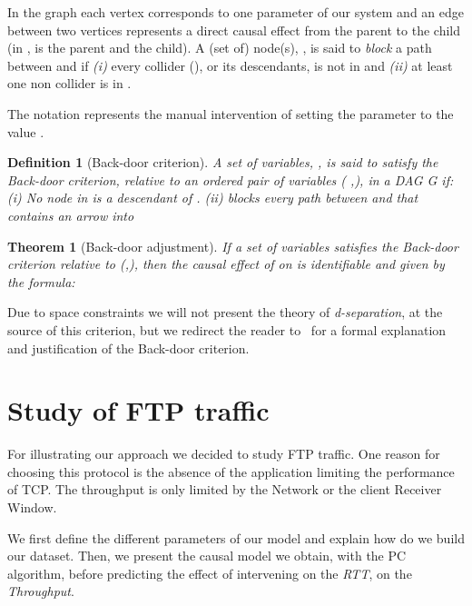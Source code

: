 \documentclass[]{algotel}
\newtheorem{mydef}{Definition}
\newtheorem{mytheor}{Theorem}
\begin{document}
In the graph each vertex corresponds to one parameter of our system and an edge between two vertices represents a direct causal effect from the parent to the child (in ,  is the parent and  the child). A (set of) node(s), , is said to \emph{block} a path between  and  if \textit{(i)} every collider (), or its descendants, is not in  and \textit{(ii)} at least one non collider is in .

The notation  represents the manual intervention of setting the parameter  to the value .

\begin{mydef}[Back-door criterion]
 A set of variables, , is said to satisfy the Back-door criterion, relative to an ordered
pair of variables ( ,), in a DAG G if: \textit{(i)} No node in  is a descendant of . \textit{(ii)}  blocks every path between  and  that contains an arrow into 
\end{mydef}

\begin{mytheor}[Back-door adjustment]
  If a set of variables  satisfies the Back-door criterion relative to (,), then the
  causal effect of  on  is identifiable and given by the formula:
  
\end{mytheor}

Due to space constraints we will not present the theory of \emph{d-separation}, at the source of this criterion, but we redirect the reader to~\cite{PearlJ2000} for a formal explanation and justification of the Back-door criterion.



\section{Study of FTP traffic}
\label{sec:ftpstudy}
For illustrating our approach we decided to study FTP traffic. One reason for choosing this protocol is the absence of the application limiting the performance of TCP. The throughput is only limited by the Network or the client Receiver Window.

We first define the different parameters of our model and explain how do we build our dataset. Then, we present the causal model we obtain, with the PC algorithm, before predicting the effect of intervening on the \emph{RTT}, on the \emph{Throughput}.
\end{document}
